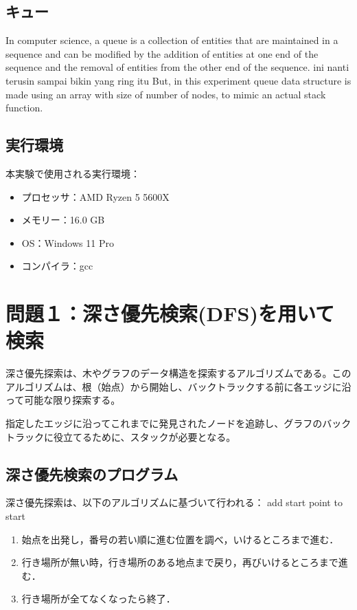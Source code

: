 \documentclass[a4j, titlepage]{jarticle}
\begin{document}
    \subsection{キュー}
    In computer science, a queue is a collection of entities that are maintained in a sequence and can be modified by the addition of entities at one end of the sequence and the removal of entities from the other end of the sequence. 
    ini nanti terusin sampai bikin yang ring itu 
    But, in this experiment queue data structure is made using an array with size of number of nodes, to mimic an actual stack function.

    
    \subsection{実行環境}
    本実験で使用される実行環境：
    \begin{screen}
        \begin{itemize}
            \item プロセッサ：AMD Ryzen 5 5600X
            \item メモリー：16.0 GB
            \item OS：Windows 11 Pro
            \item コンパイラ：gcc
        \end{itemize}    
    \end{screen}

\section{問題１：深さ優先検索(DFS)を用いて検索}
    深さ優先探索は、木やグラフのデータ構造を探索するアルゴリズムである。このアルゴリズムは、根（始点）から開始し、バックトラックする前に各エッジに沿って可能な限り探索する。

    指定したエッジに沿ってこれまでに発見されたノードを追跡し、グラフのバックトラックに役立てるために、スタックが必要となる。

    \subsection{深さ優先検索のプログラム}
    深さ優先探索は、以下のアルゴリズムに基づいて行われる：
    add start point to start
    \begin{screen}
        \begin{enumerate}
            \item 始点を出発し，番号の若い順に進む位置を調べ，いけるところまで進む．
            \item 行き場所が無い時，行き場所のある地点まで戻り，再びいけるところまで進む．
            \item 行き場所が全てなくなったら終了．
        \end{enumerate}
    \end{screen}
\end{document}
